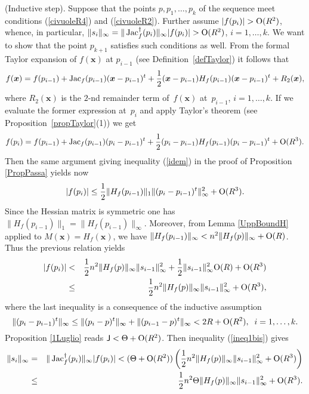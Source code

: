 \documentclass[10pt]{article}
\newcommand{\x}{{\bm x}}
\def\Jac{\mathop{\rm Jac}\nolimits}
\begin{document}
{ (Inductive step). Suppose that the points $p, p_1,\ldots,p_k$  of the sequence meet conditions (\ref{civuoleR4}) and (\ref{civuoleR2}). Further assume  $|f(p_i)|>{\rm O}(R^2)$, whence, in particular, $\|s_i\|_\infty=\|\Jac_f^\dagger (p_i)\|_\infty|f(p_i)|>{\rm O}(R^2)$, $i=1,\ldots,k$. We want to show that the point $p_{k+1}$ satisfies such conditions as well.
From the formal Taylor expansion of $f(\x)$ at $p_{i-1}$ (see 
Definition~\ref{defTaylor}) it follows that
$$
f(\x) = f(p_{i-1}) + \Jac_f(p_{i-1}) (\x-p_{i-1})^t + \frac{1}{2}(\x-p_{i-1})H_f(p_{i-1}) (\x-p_{i-1})^t + R_2(\x),
$$
where $R_2(\bm x)$ is the $2$-nd remainder term of~$f(\x)$ at~$p_{i-1}$, $i=1,\ldots,k$.
If we evaluate the former expression at~$p_i$ and apply 
Taylor's theorem (see Proposition~\ref{propTaylor}(1)) we get
\begin{equation}\label{EqT1bis}
f(p_i) = f(p_{i-1}) + \Jac_f(p_{i-1}) (p_i-p_{i-1})^t + 
\frac{1}{2}(p_i-p_{i-1})H_f(p_{i-1}) (p_i-p_{i-1})^t + {\rm O}(R^3).
\end{equation}
Then  the same argument  giving inequality (\ref{idem}) in the proof of Proposition \ref{PropPassa}  yields now
$$
|f(p_i)|\leq  \frac{1}{2}  \|H_f(p_{i-1})\|_1 \|(p_i - p_{i-1})^t\|_\infty^2 + {\rm O}(R^3).
$$
Since the Hessian matrix is symmetric one has
$\|H_f(p_{i-1})\|_1=\|H_f(p_{i-1})\|_\infty$. Moreover, from  Lemma \ref{UppBoundH}
applied to  $M(\x)= H_f(\x)$, we have $\|H_f(p_{i-1})\|_\infty < n^2 \|H_f(p)\|_\infty + {\rm O}(R)$. 
Thus the previous relation yields
\begin{eqnarray}\label{ineq1bis}
|f(p_i)| &<&   
\frac{1}{2} n^2 \|H_f(p)\|_\infty \|s_{i-1}\|_\infty^2 + \frac{1}{2}  \|s_{i-1}\|_\infty^2 {\rm O}(R)+ {\rm O}(R^3) \nonumber\\
&\le& \frac{1}{2} n^2 \|H_f(p)\|_\infty \|s_{i-1}\|_\infty^2 + {\rm O}(R^3),
\end{eqnarray}
where 
the last inequality is a consequence of  the inductive assumption $$\| (p_i-p_{i-1})^t\|_{\infty}\leq \| (p_i-p)^t\|_{\infty}+\| (p_{i-1}-p)^t\|_{\infty}<2R+{\rm O}(R^2), \;\; i=1,\ldots, k.$$ Proposition \ref{1Luglio} reads ${\mathsf J}<\Theta+{\rm O}(R^2)$. Then 
inequality (\ref{ineq1bis})  gives 
\begin{eqnarray*}
\|s_i\|_\infty &=& \|\Jac_f^\dagger(p_i)\|_\infty |f(p_i)|
< (\Theta +{\rm O}(R^2)) \left( \frac{1}{2} n^2 \|H_f(p)\|_\infty \|s_{i-1}\|_\infty^2 + {\rm O}(R^3) \right)\\
&\le& \frac{1}{2} n^2 \Theta \|H_f(p)\|_\infty  \|s_{i-1}\|_\infty^2 + {\rm O}(R^3).

\end{eqnarray*}}
\end{document}
